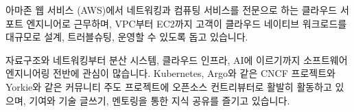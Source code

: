 

\begin{cvparagraph}

아마존 웹 서비스 (AWS)에서 네트워킹과 컴퓨팅 서비스를 전문으로 하는 클라우드 서포트 엔지니어로 근무하며, VPC부터 EC2까지 고객이 클라우드 네이티브 워크로드를 대규모로 설계, 트러블슈팅, 운영할 수 있도록 돕고 있습니다.

자료구조와 네트워킹부터 분산 시스템, 클라우드 인프라, AI에 이르기까지 소프트웨어 엔지니어링 전반에 관심이 많습니다. Kubernetes, Argo와 같은 CNCF 프로젝트와 Yorkie와 같은 커뮤니티 주도 프로젝트에 오픈소스 컨트리뷰터로 활발히 활동하고 있으며, 기여와 기술 글쓰기, 멘토링을 통한 지식 공유를 즐기고 있습니다.
\end{cvparagraph}
